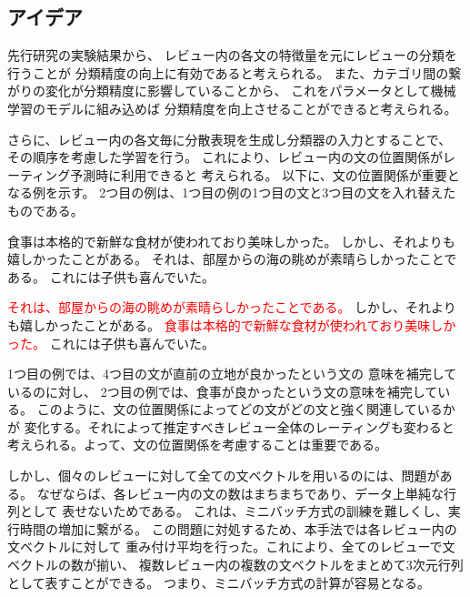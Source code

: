 \documentclass[twocolumn,a4paper]{ltjarticle}
\begin{document}
\subsection{アイデア}

先行研究\cite{fujitani15}の実験結果から、
レビュー内の各文の特徴量を元にレビューの分類を行うことが
分類精度の向上に有効であると考えられる。
また、カテゴリ間の繋がりの変化が分類精度に影響していることから、
これをパラメータとして機械学習のモデルに組み込めば
分類精度を向上させることができると考えられる。

さらに、レビュー内の各文毎に分散表現を生成し分類器の入力とすることで、
その順序を考慮した学習を行う。
これにより、レビュー内の文の位置関係がレーティング予測時に利用できると
考えられる。
以下に、文の位置関係が重要となる例を示す。
2つ目の例は、1つ目の例の1つ目の文と3つ目の文を入れ替えたものである。

\begin{addmargin}{8ex}
  \vspace{1em}
  食事は本格的で新鮮な食材が使われており美味しかった。
  しかし、それよりも嬉しかったことがある。
  それは、部屋からの海の眺めが素晴らしかったことである。
  これには子供も喜んでいた。
\end{addmargin}

\begin{addmargin}{8ex}
  \vspace{1em}
  \textcolor{red}{それは、部屋からの海の眺めが素晴らしかったことである。}
  しかし、それよりも嬉しかったことがある。
  \textcolor{red}{食事は本格的で新鮮な食材が使われており美味しかった。}
  これには子供も喜んでいた。
\end{addmargin}

1つ目の例では、4つ目の文が直前の立地が良かったという文の
意味を補完しているのに対し、
2つ目の例では、食事が良かったという文の意味を補完している。
このように、文の位置関係によってどの文がどの文と強く関連しているかが
変化する。それによって推定すべきレビュー全体のレーティングも変わると
考えられる。よって、文の位置関係を考慮することは重要である。

しかし、個々のレビューに対して全ての文ベクトルを用いるのには、問題がある。
なぜならば、各レビュー内の文の数はまちまちであり、データ上単純な行列として
表せないためである。
これは、ミニバッチ方式の訓練を難しくし、実行時間の増加に繋がる。
この問題に対処するため、本手法では各レビュー内の文ベクトルに対して
重み付け平均を行った。これにより、全てのレビューで文ベクトルの数が揃い、
複数レビュー内の複数の文ベクトルをまとめて3次元行列として表すことができる。
つまり、ミニバッチ方式の計算が容易となる。
\end{document}
